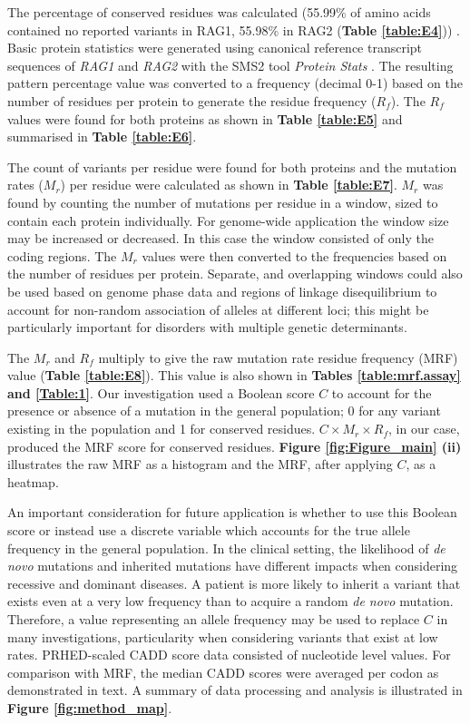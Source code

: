 \documentclass[preprint,11pt,fleqn]{elsarticle}
\begin{document}
The percentage of conserved residues was calculated (55.99\% of amino acids contained no reported variants in RAG1, 55.98\% in RAG2 
(\textbf{Table \ref{table:E4}})) . 
Basic protein statistics were generated using canonical reference transcript sequences of \textit{RAG1} and \textit{RAG2} with the SMS2 tool \textit{Protein Stats}
\citep{stothard2000sequence}. 
The resulting pattern percentage value was converted to a frequency (decimal 0-1) based on the number of residues per protein to generate the residue frequency (${R}_{f}$).
The ${R}_{f}$ values were found for both proteins as shown in 
\textbf{Table \ref{table:E5}} and summarised in \textbf{Table \ref{table:E6}}. 

The count of variants per residue were found for both proteins and the  mutation rates (${M}_{r}$) per residue were calculated as shown in \textbf{Table \ref{table:E7}}. 
${M}_{r}$ was found by counting the number of mutations per residue in a window, sized to contain each protein individually.
For genome-wide application the window size may be increased or decreased. 
In this case the window consisted of only the coding regions.
The ${M}_{r}$ values were then converted to the frequencies based on the number of residues per protein.
Separate, and overlapping windows could also be used based on genome phase data and regions of linkage disequilibrium to account for non-random association of alleles at different loci; this might be particularly important for disorders with multiple genetic determinants. 

The ${M}_{r}$ and ${R}_{f}$  multiply to give the raw mutation rate residue frequency (MRF) value 
(\textbf{Table \ref{table:E8}}).
This value is also shown in 
\textbf{Tables \ref{table:mrf.assay} and \ref{Table:1}}. 
Our investigation used a Boolean score $C$ to account for the presence or absence of a mutation in the general population; 0 for any variant existing in the population and 1 for conserved residues. 
$C \times {M}_{r} \times  {R}_{f}$, in our case, produced the MRF score for conserved residues.
\textbf{Figure \ref{fig:Figure_main} (ii)} illustrates the raw MRF as a histogram and the MRF, after applying $C$, as a heatmap.

An important consideration for future application is whether to use this Boolean score or instead use a discrete variable which accounts for the true allele frequency in the general population. 
In the clinical setting, the likelihood of \textit{de novo} mutations and inherited mutations have different impacts when considering recessive and dominant diseases. 
A patient is more likely to inherit a variant that exists even at a very low frequency than to acquire a random \textit{de novo} mutation. 
Therefore, a value representing an allele frequency may be used to replace $C$ in many investigations, particularity when considering variants that exist at low rates. 
PRHED-scaled CADD score data consisted of nucleotide level values. 
For comparison with MRF, the median CADD scores were averaged per codon as demonstrated in 
 text.
A summary of data processing and analysis is illustrated in \textbf{Figure 
\ref{fig:method_map}}.
\end{document}
